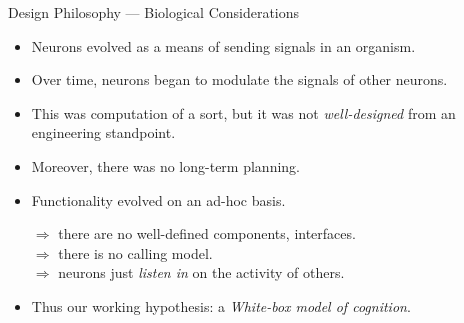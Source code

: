 \documentclass{beamer}
\begin{document}
   

   \begin{frame}{Design Philosophy --- Biological Considerations}
      \begin{itemize}
         \item Neurons evolved as a means of sending signals in an organism.
         \medskip
         \item Over time, neurons began to modulate the signals of other neurons.
         \medskip
         \item This was computation of a sort, but it was not \emph{well-designed} from an engineering standpoint.
         \medskip
         \item Moreover, there was no long-term planning.
         \medskip
         \item Functionality evolved on an ad-hoc basis.\\
         
         \vspace{2mm}
         
            $\Rightarrow$ there are no well-defined components, interfaces.\\
            $\Rightarrow$ there is no calling model.\\
            $\Rightarrow$ neurons just \emph{listen in} on the activity of others.
            
         \pause
         \medskip
         \item Thus our working hypothesis: a \emph{White-box model of cognition}.
       \end{itemize}
   \end{frame}
   
\end{document}
